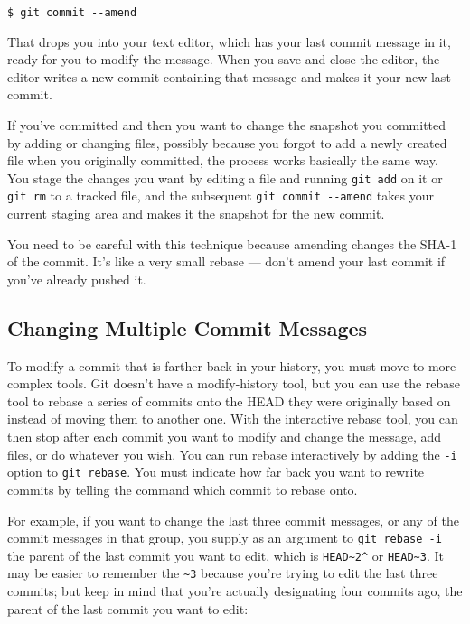 \documentclass[a4paper]{book}
\begin{document}
\begin{shaded}\begin{verbatim}
$ git commit --amend
\end{verbatim}\end{shaded}

That drops you into your text editor, which has your last commit message in it, ready for you to modify the message. When you save and close the editor, the editor writes a new commit containing that message and makes it your new last commit.

If you've committed and then you want to change the snapshot you committed by adding or changing files, possibly because you forgot to add a newly created file when you originally committed, the process works basically the same way. You stage the changes you want by editing a file and running \texttt{git add} on it or \texttt{git rm} to a tracked file, and the subsequent \texttt{git commit -{}-amend} takes your current staging area and makes it the snapshot for the new commit.

You need to be careful with this technique because amending changes the SHA-1 of the commit. It's like a very small rebase --- don't amend your last commit if you've already pushed it.

\subsection{Changing Multiple Commit Messages}\label{changing-multiple-commit-messages}

To modify a commit that is farther back in your history, you must move to more complex tools. Git doesn't have a modify-history tool, but you can use the rebase tool to rebase a series of commits onto the HEAD they were originally based on instead of moving them to another one. With the interactive rebase tool, you can then stop after each commit you want to modify and change the message, add files, or do whatever you wish. You can run rebase interactively by adding the \texttt{-i} option to \texttt{git rebase}. You must indicate how far back you want to rewrite commits by telling the command which commit to rebase onto.

For example, if you want to change the last three commit messages, or any of the commit messages in that group, you supply as an argument to \texttt{git rebase -i} the parent of the last commit you want to edit, which is \texttt{HEAD\textasciitilde{}2\^{}} or \texttt{HEAD\textasciitilde{}3}. It may be easier to remember the \texttt{\textasciitilde{}3} because you're trying to edit the last three commits; but keep in mind that you're actually designating four commits ago, the parent of the last commit you want to edit:
\end{document}
